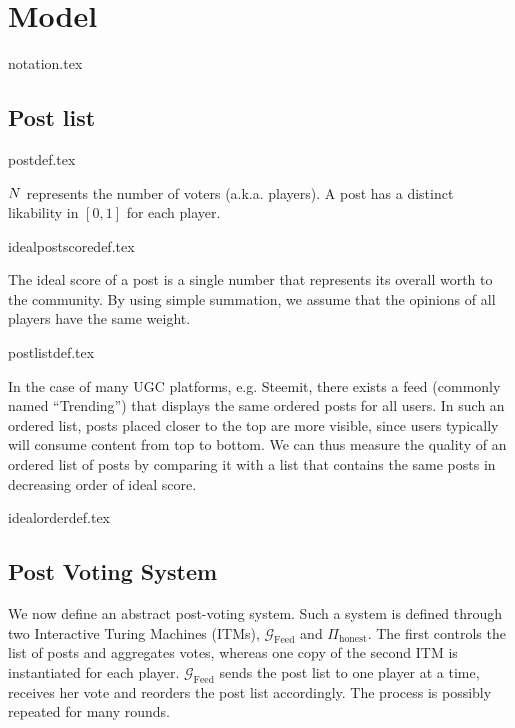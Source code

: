 \section{Model}
  {notation.tex}

  \subsection{Post list}
    {postdef.tex}

    \noindent $N$ represents the number of voters (a.k.a. players). A
    post has a distinct likability in $\left[0, 1\right]$ for each player.

    {idealpostscoredef.tex}

    \noindent The ideal score of a post is a single number that represents its
    overall worth to the community. By using simple summation, we assume that
    the opinions of all players have the same weight.

    {postlistdef.tex}

    \noindent In the case of many UGC platforms, e.g. Steemit, there exists a
    feed (commonly named ``Trending'') that displays the same ordered posts for
    all users. In such an ordered list, posts placed closer to the top are more
    visible, since users typically will consume content from top to bottom. We
    can thus measure the quality of an ordered list of posts by comparing it
    with a list that contains the same posts in decreasing order of ideal score.

    {idealorderdef.tex}

  \subsection{Post Voting System}

    We now define an abstract post-voting system. Such a system is defined
    through two Interactive Turing Machines (ITMs),
    $\mathcal{G}_{\mathrm{Feed}}$ and $\Pi_{\mathrm{honest}}$. The first
    controls the list of posts and aggregates votes, whereas one copy of the
    second ITM is instantiated for each player. $\mathcal{G}_{\mathrm{Feed}}$
    sends the post list to one player at a time, receives her vote and reorders
    the post list accordingly. The process is possibly repeated for many rounds.

